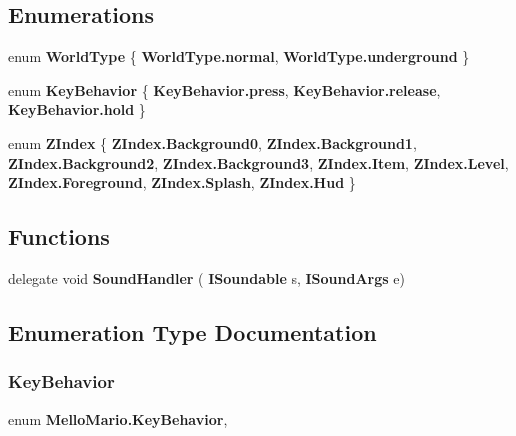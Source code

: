 \subsection*{Enumerations}
\begin{DoxyCompactItemize}
\item 
enum \textbf{ World\+Type} \{ \textbf{ World\+Type.\+normal}, 
\textbf{ World\+Type.\+underground}
 \}
\item 
enum \textbf{ Key\+Behavior} \{ \textbf{ Key\+Behavior.\+press}, 
\textbf{ Key\+Behavior.\+release}, 
\textbf{ Key\+Behavior.\+hold}
 \}
\item 
enum \textbf{ Z\+Index} \{ \newline
\textbf{ Z\+Index.\+Background0}, 
\textbf{ Z\+Index.\+Background1}, 
\textbf{ Z\+Index.\+Background2}, 
\textbf{ Z\+Index.\+Background3}, 
\newline
\textbf{ Z\+Index.\+Item}, 
\textbf{ Z\+Index.\+Level}, 
\textbf{ Z\+Index.\+Foreground}, 
\textbf{ Z\+Index.\+Splash}, 
\newline
\textbf{ Z\+Index.\+Hud}
 \}
\end{DoxyCompactItemize}
\subsection*{Functions}
\begin{DoxyCompactItemize}
\item 
delegate void \textbf{ Sound\+Handler} (\textbf{ I\+Soundable} s, \textbf{ I\+Sound\+Args} e)
\end{DoxyCompactItemize}


\subsection{Enumeration Type Documentation}
\mbox{\label{namespaceMelloMario_a8d58f2345ab32de008cdb81228777c61}} 
\subsubsection{Key\+Behavior}
{\footnotesize\ttfamily enum \textbf{ Mello\+Mario.\+Key\+Behavior}\hspace{0.3cm}{\ttfamily [strong]}, {\ttfamily [package]}}

